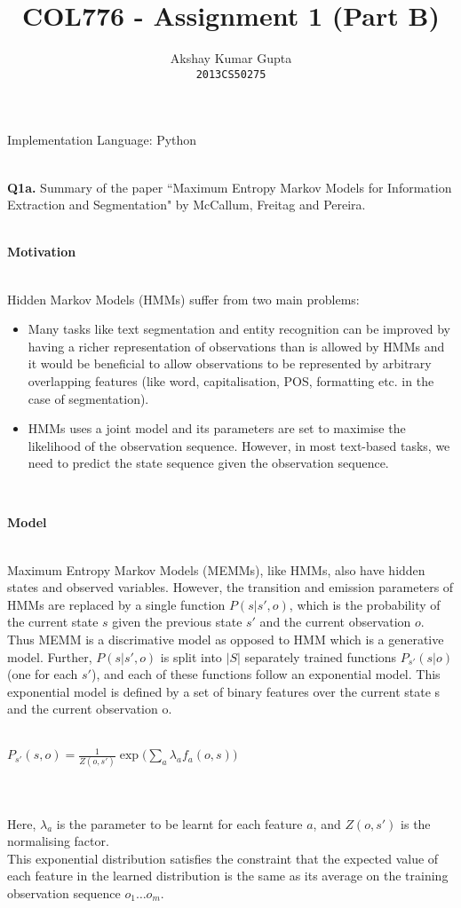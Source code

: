 \documentclass[]{article}
\begin{document}
\title{COL776 - Assignment 1 (Part B)}
\author{\Large Akshay Kumar Gupta\\ \texttt{2013CS50275}}
\date{}
\maketitle

{\noindent \large Implementation Language: Python}
\\ 
\\
\par \noindent
{{\bfseries Q1a.}} Summary of the paper ``Maximum Entropy Markov Models for Information Extraction and Segmentation" by McCallum, Freitag and Pereira. \\ \\ 
\centerline{\bfseries Motivation} \\ Hidden Markov Models (HMMs) suffer from two main problems:
\begin{itemize}
\item Many tasks like text segmentation and entity recognition can be improved by having a richer representation of observations than is allowed by HMMs and it would be beneficial to allow observations to be represented by arbitrary overlapping features (like word, capitalisation, POS, formatting etc. in the case of segmentation).
\item HMMs uses a joint model and its parameters are set to maximise the likelihood of the observation sequence. However, in most text-based tasks, we need to predict the state sequence given the observation sequence.
\end{itemize}
~\\
\centerline{\bfseries Model} \\ Maximum Entropy Markov Models (MEMMs), like HMMs, also have hidden states and observed variables. However, the transition and emission parameters of HMMs are replaced by a single function $P(s|s',o)$, which is the probability of the current state $s$ given the previous state $s'$ and the current observation $o$. Thus MEMM is a discrimative model as opposed to HMM which is a generative model. Further, $P(s|s',o)$ is split into $|S|$ separately trained functions $P_{s'}(s|o)$ (one for each $s'$), and each of these functions follow an exponential model. This exponential model is defined by a set of binary features over the current state s and the current observation o. \\ \\ \centerline {$P_{s'}(s,o) = \frac{1}{Z(o,s')} \exp\biggr(\sum\limits_{a}\lambda_af_a(o,s)\biggl)$} \\\\ Here, $\lambda_a$ is the parameter to be learnt for each feature $a$, and $Z(o,s')$ is the normalising factor. \vspace*{0.2cm}\\This exponential distribution satisfies the constraint that the expected value of each feature in the learned distribution is the same as its average on the training observation sequence $o_1\ldots o_m$. 
\end{document}
